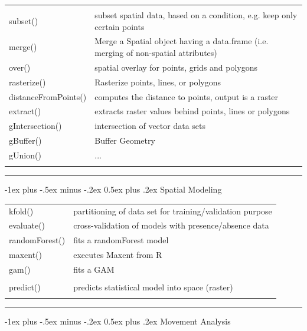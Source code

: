 \documentclass[10pt,landscape]{article}
\makeatletter
\renewcommand{\section}{\@startsection{section}{1}{0mm}%
                                {-1ex plus -.5ex minus -.2ex}%
                                {0.5ex plus .2ex}%
                                {\normalfont\large\bfseries}}
\makeatother
\begin{document}
\begin{multicols}{3}
\begin{tabular}{@{}p{\the\MyLen}%
                @{}p{\linewidth-\the\MyLen}@{}}
                & \\
subset()		& subset spatial data, based on a condition, e.g. keep only certain points \\                
merge() 		& Merge a Spatial object having a data.frame (i.e. merging of non-spatial attributes)\\
over()			& spatial overlay for points, grids and polygons \\
rasterize() 		& Rasterize points, lines, or polygons\\ 
distanceFromPoints()    & computes the distance to points, output is a raster\\
extract()		& extracts raster values behind points, lines or polygons \\
gIntersection()		& intersection of vector data sets \\
gBuffer()		& Buffer Geometry \\
gUnion()		& ... \\
 & 
\end{tabular}


\rule{0.32\textwidth}{0.4pt}



\section{Spatial Modeling}

\begin{tabular}{@{}p{\the\MyLen}%
                @{}p{\linewidth-\the\MyLen}@{}}
kfold() & partitioning of data set for training/validation purpose\\
evaluate() & cross-validation of models with presence/absence data\\               
randomForest() & fits a randomForest model  \\
maxent() & executes Maxent from R\\
gam() & fits a GAM \\
 &  \\                
predict() & predicts statistical model into space (raster) \\

 & 

\end{tabular}


\rule{0.32\textwidth}{0.4pt}
\scriptsize


\section{Movement Analysis}


\end{multicols}
\end{document}
